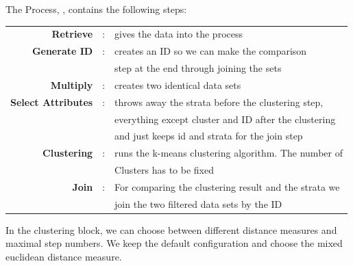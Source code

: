 	The Process, , contains the following steps:\\

	\begin{tabular}{r c l}
		\textbf{Retrieve} & : &  gives the data into the process \\
		\textbf{Generate ID} & : & creates an ID so we can make the comparison\\
		 & & step at the end through joining the sets\\
		\textbf{Multiply} & : & creates two identical data sets\\
		\textbf{Select Attributes} & : &  throws away the strata before the clustering step,\\
		& & everything except cluster and ID after the clustering \\
		& & and just keeps id and strata for the join step\\
		\textbf{Clustering} & : &  runs the k-means clustering algorithm. The number of \\
		& & Clusters has to be fixed \\
		\textbf{Join} & : & For comparing the clustering result and the strata we \\
		& & join the two filtered data sets by the ID \\
	\end{tabular}
	
	In the clustering block, we can choose between different distance measures and maximal step numbers. We keep the default configuration and choose the mixed euclidean distance measure.
\vspace*{-1em}
